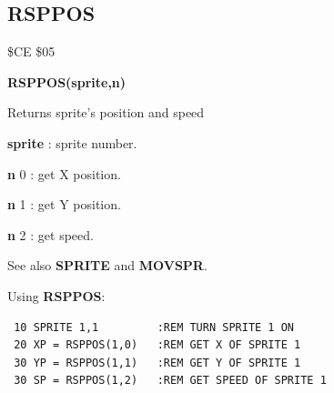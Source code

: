\subsection{RSPPOS}
\begin{description}[leftmargin=2cm,style=nextline]
\item [Token:] \$CE \$05
\item [Format:] {\bf RSPPOS(sprite,n)}
\item [Usage:]  Returns sprite's position and speed

                {\bf sprite} : sprite number.

                {\bf n} 0 : get X position.

                {\bf n} 1 : get Y position.

                {\bf n} 2 : get speed.


\item [Remarks:] See also {\bf SPRITE} and {\bf MOVSPR}.

\item [Example:] Using {\bf RSPPOS}:
\begin{tcolorbox}[colback=black,coltext=white]
\verbatimfont{\codefont}
\begin{verbatim}
 10 SPRITE 1,1         :REM TURN SPRITE 1 ON
 20 XP = RSPPOS(1,0)   :REM GET X OF SPRITE 1
 30 YP = RSPPOS(1,1)   :REM GET Y OF SPRITE 1
 30 SP = RSPPOS(1,2)   :REM GET SPEED OF SPRITE 1
\end{verbatim}
\end{tcolorbox}
\end{description}


\newpage
